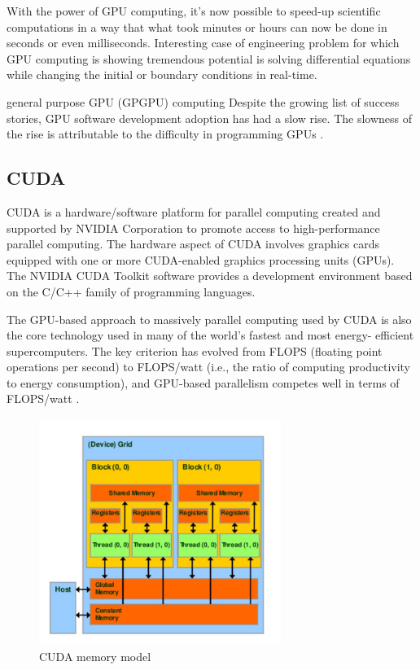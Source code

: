 With the power of GPU computing, it's now possible to speed-up scientific computations in a way that what took minutes or hours can now be done in seconds or even milliseconds. Interesting case of engineering problem for which GPU computing is showing tremendous potential is solving differential equations while changing the initial or boundary conditions in real-time.

general purpose GPU (GPGPU) computing
Despite the growing list of success stories, GPU software development adoption has had a slow rise. The slowness of the rise is attributable to the difficulty in programming GPUs \citep{malcolmArrayFireGPUAcceleration2012}.

\subsection{CUDA}

CUDA is a hardware/software platform for parallel computing created and supported by NVIDIA Corporation to promote access to high-performance parallel computing. The hardware aspect of CUDA involves graphics cards equipped with one or more CUDA-enabled graphics processing units (GPUs). The NVIDIA CUDA Toolkit software provides a development environment based on the C/C++ family of programming languages.

\cite{stortiCudaForEngineers2015}

The GPU-based approach to massively parallel computing used by CUDA is also the core technology used in many of the world’s fastest and most energy- efficient supercomputers. The key criterion has evolved from FLOPS (floating point operations per second) to FLOPS/watt (i.e., the ratio of computing productivity to energy consumption), and GPU-based parallelism competes well in terms of FLOPS/watt \citep{stortiCudaForEngineers2015}.


\citep{karimiPerformanceComparisonCUDA}

\begin{figure}[!ht]
	\centering
	\includegraphics[width=0.7\textwidth]{figures/cuda-device-memory.jpg}
	\caption{CUDA memory model}
	\label{fig:cuda-memory-model}
\end{figure}

